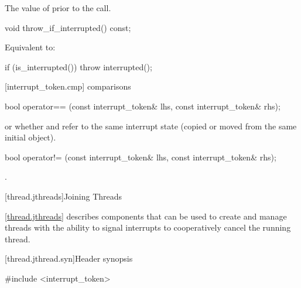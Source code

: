 {\begin{itemdescr}
  \pnum\postconditions {}

  \pnum\returns The value of  prior to the call.
\end{itemdescr}

%
\begin{itemdecl}
void throw_if_interrupted() const;
\end{itemdecl}
\begin{itemdescr}
  \pnum\effects Equivalent to:
\begin{codeblock}
if (is_interrupted())
  throw interrupted();
\end{codeblock}
\end{itemdescr}


[interrupt_token.cmp]{ comparisons}

%
\begin{itemdecl}
bool operator== (const interrupt_token& lhs, const interrupt_token& rhs);
\end{itemdecl}
\begin{itemdescr}
  \pnum\returns {} or
                whether  and  refer to the
                same interrupt state
                (copied or moved from the same initial  object).
\end{itemdescr}

%
\begin{itemdecl}
bool operator!= (const interrupt_token& lhs, const interrupt_token& rhs);
\end{itemdecl}
\begin{itemdescr}
  \pnum\returns {}.
\end{itemdescr}


\clearpage

[thread.jthreads]{Joining Threads}


\pnum
\ref{thread.jthreads} describes components that can be used to create and manage threads
with the ability to signal interrupts to cooperatively cancel the running thread.

[thread.jthread.syn]{Header  synopsis}
%

\begin{codeblock}
#include <interrupt_token>


\end{codeblock}}
